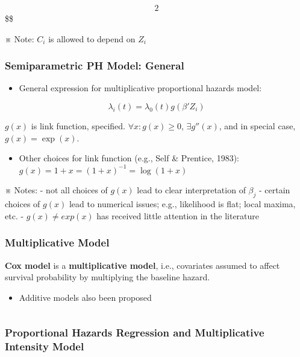\documentclass[
]{book}
\providecommand{\tightlist}{%
  \setlength{\itemsep}{0pt}\setlength{\parskip}{0pt}}
\begin{document}
{{{\begin{alignat}{2}
\end{alignat}
\$\$

※ Note: \(C_i\) is allowed to depend on \(Z_i\)

\hypertarget{semiparametric-ph-model-general}{%
\subsubsection{Semiparametric PH Model: General}\label{semiparametric-ph-model-general}}

\begin{itemize}
\tightlist
\item
  General expression for multiplicative proportional hazards model:
\end{itemize}

\[
\lambda_i (t) = \lambda_0 (t) g(\beta ' Z_i )
\]

\(g(x)\) is link function, specified. \(\forall x: g(x) \ge 0\), \(\exists g''(x)\), and in special case, \(g(x) = \exp(x)\).

\begin{itemize}
\tightlist
\item
  Other choices for link function (e.g., Self \& Prentice, 1983):
  \(g(x) = 1+x = (1+x)^{-1} = \log(1+x)\)
\end{itemize}

※ Notes:
- not all choices of \(g(x)\) lead to clear interpretation of \(\beta_j\)
- certain choices of \(g(x)\) lead to numerical issues; e.g., likelihood is flat; local maxima, etc.
- \(g(x) \not = exp(x)\) has received little attention in the literature

\hypertarget{multiplicative-model}{%
\subsubsection{Multiplicative Model}\label{multiplicative-model}}

\textbf{Cox model} is a \textbf{multiplicative model}, i.e., covariates assumed to affect survival probability by multiplying the baseline hazard.

\begin{itemize}
\tightlist
\item
  Additive models also been proposed
\end{itemize}

\[
\]

\hypertarget{proportional-hazards-regression-and-multiplicative-intensity-model}{%
\subsubsection{Proportional Hazards Regression and Multiplicative Intensity Model}\label{proportional-hazards-regression-and-multiplicative-intensity-model}}

}}}
\end{document}
